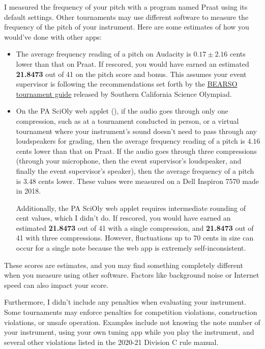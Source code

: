 \documentclass[12pt,letterpaper]{article}
\def\audacityEstimate{21.8473}
\def\pasciolyEstimate{21.8473}
\def\pasciolyEstimateTC{21.8473}
\begin{document}
I measured the frequency of your pitch with a program named Praat using its default settings. Other tournaments may use different software to measure the frequency of the pitch of your instrument. Here are some estimates of how you would've done with other apps:
\begin{itemize}
\item The average frequency reading of a pitch on Audacity is $0.17\pm2.16
$ cents lower than that on Praat. If rescored, you would have earned an estimated \textbf{\audacityEstimate} out of 41 on the pitch score and bonus. This assumes your event supervisor is following the recommendations set forth by the \href{https://docs.google.com/document/d/1VBmM2NzHvc5F2ZHKz4Warf_NGrkn1ADL1Gx0DPHVrJ4/edit#bookmark=id.lu1jk8vh7g7z}{BEARSO tournament guide} released by Southern California Science Olympiad.


\item On the PA SciOly web applet (), if the audio goes through only one compression, such as at a tournament conducted in person, or a virtual tournament where your instrument's sound doesn't need to pass through any loudspeakers for grading, then the average frequency reading of a pitch is $4.16$ cents lower than that on Praat.  If the audio goes through three compressions (through your microphone, then the event supervisor's loudspeaker, and finally the event supervisor's speaker), then the average frequency of a pitch is $3.48$ cents lower. These values were measured on a Dell Inspiron 7570 made in 2018. %

Additionally, the PA SciOly web applet requires intermediate rounding of cent values, which I didn't do. If rescored, you would have earned an estimated \textbf{\pasciolyEstimate} out of 41 with a single compression, and \textbf{\pasciolyEstimateTC} out of 41 with three compressions. However, fluctuations up to 70 cents in size can occur for a single note because the web app is extremely self-inconsistent.
\end{itemize}
These scores are estimates, and you may find something completely different when you measure using other software. Factors like background noise or Internet speed can also impact your score.

Furthermore, I didn't include any penalties when evaluating your instrument. Some tournaments may enforce penalties for competition violations, construction violations, or unsafe operation. Examples include not knowing the note number of your instrument, using your own tuning app while you play the instrument, and several other violations listed in the 2020-21 Division C rule manual.
\end{document}
